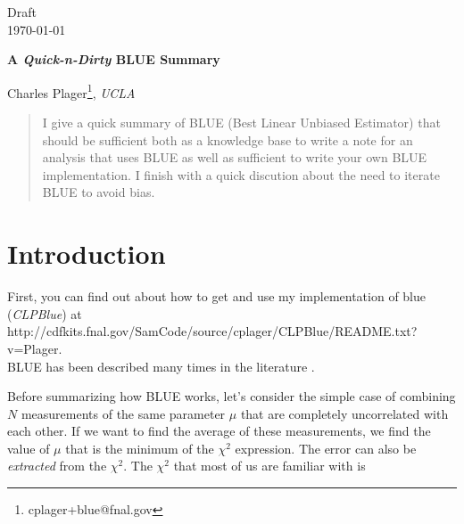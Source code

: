 \documentclass[12pt,twoside,letterpaper]{article}
\newcommand{\href}[2]{#2}                   %
\begin{document}
\thispagestyle{empty}
\vspace*{-3.5cm}
\begin{flushright}
Draft \\
\today
\end{flushright}

\vspace{0.5in}

\begin{center}
  \begin{Large}
  {\bf A {\em Quick-n-Dirty} BLUE Summary}
  \end{Large}
\end{center}

\vspace{0.5in}

\begin{center}

\href{mailto:cplager+tdl@fnal.gov}{Charles
Plager}\footnote{cplager+blue@fnal.gov},
\vspace{1.0ex} 
\emph{UCLA}
\end{center}

\begin{abstract}
I give a quick summary of BLUE (Best Linear Unbiased Estimator) that
should be sufficient both as a knowledge base to write a note for an
analysis that uses BLUE as well as sufficient to write your own BLUE
implementation.  I finish with a quick discution about the need to
iterate BLUE to avoid bias.
\end{abstract}



\section{Introduction}


\hspace*{12pt} First, you can find out about how to get and use my
implementation of blue ({\em CLPBlue})
at\\
\href{http://cdfkits.fnal.gov/SamCode/source/cplager/CLPBlue/README.txt?v=Plager}{http://cdfkits.fnal.gov/SamCode/source/cplager/CLPBlue/README.txt?v=Plager}. \\
BLUE has been described many times in the literature \cite{blue1,
  blue2}.


Before summarizing how BLUE works, let's consider the simple case of
combining $N$ measurements of the same parameter $\mu$ that are
completely uncorrelated with each other.  If we want to find the
average of these measurements, we find the value of $\mu$ that is the
minimum of the $\chi^2$ expression.  The error can also be {\em
  extracted} from the $\chi^2$.  The $\chi^2$ that most of us are
familiar with is
\end{document}
